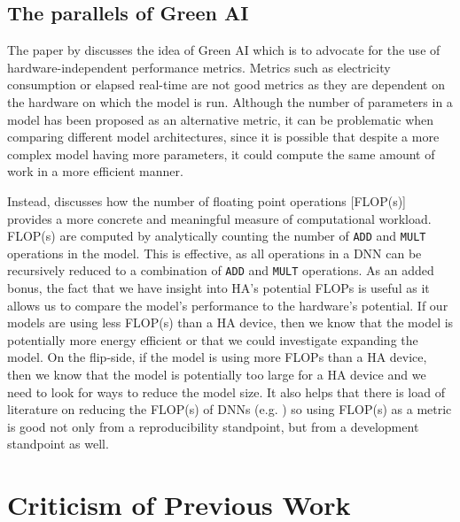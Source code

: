 \documentclass[logo,bsc,singlespacing,parskip,online]{infthesis}
\begin{document}

\subsection{The parallels of Green AI}
The paper by \citet{schwartz2019greenai} discusses the idea of Green AI 
which is to advocate for the use of hardware-independent performance metrics.
Metrics such as electricity consumption or elapsed real-time are not good metrics 
as they are dependent on the hardware on which the model is run. 
Although the number of parameters in a model has been proposed as an 
alternative metric, it can be problematic when comparing different model architectures, 
since it is possible that despite a more complex model having more parameters, 
it could compute the same amount of work in a more efficient manner. 

Instead, \citet{schwartz2019greenai} discusses how the number of floating point operations [FLOP(s)]
provides a more concrete and meaningful measure of computational workload. 
FLOP(s) are computed by analytically counting the number of \texttt{ADD} and \texttt{MULT} operations in the model.
This is effective, as all operations in a DNN can be recursively reduced to a combination 
of \texttt{ADD} and \texttt{MULT} operations.
As an added bonus, the fact that we have insight into HA's potential FLOPs is useful 
as it allows us to compare the model's performance to the hardware's potential. If our
models are using less FLOP(s) than a HA device, then we know that the model is
potentially more energy efficient or that we could investigate expanding
the model. On the flip-side, if the model is using more FLOPs than a HA device, 
then we know that the model is potentially too large for a HA device and we need
to look for ways to reduce the model size. It also helps that there is load
of literature on reducing the FLOP(s) of DNNs (e.g. \cite{liu_simple_2023}) so
using FLOP(s) as a metric is good not only from a reproducibility standpoint, 
but from a development standpoint as well. 

\section{Criticism of Previous Work}
\label{sec:criticism}
\end{document}
